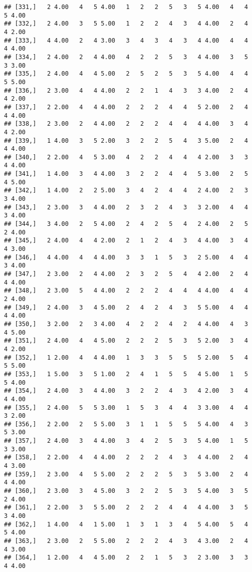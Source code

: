 \documentclass[]{article}
\begin{document}
\begin{verbatim}
## [331,]   2 4.00   4   5 4.00   1   2   2   5   3   5 4.00   4   4   5 4.00
## [332,]   2 4.00   3   5 5.00   1   2   2   4   3   4 4.00   2   4   4 2.00
## [333,]   4 4.00   2   4 3.00   3   4   3   4   3   4 4.00   4   4   4 4.00
## [334,]   2 4.00   2   4 4.00   4   2   2   5   3   4 4.00   3   5   3 3.00
## [335,]   2 4.00   4   4 5.00   2   5   2   5   3   5 4.00   4   4   5 5.00
## [336,]   2 3.00   4   4 4.00   2   2   1   4   3   3 4.00   2   4   4 2.00
## [337,]   2 2.00   4   4 4.00   2   2   2   4   4   5 2.00   2   4   4 4.00
## [338,]   2 3.00   2   4 4.00   2   2   2   4   4   4 4.00   3   4   4 2.00
## [339,]   1 4.00   3   5 2.00   3   2   2   5   4   3 5.00   2   4   4 4.00
## [340,]   2 2.00   4   5 3.00   4   2   2   4   4   4 2.00   3   3   4 4.00
## [341,]   1 4.00   3   4 4.00   3   2   2   4   4   5 3.00   2   5   4 5.00
## [342,]   1 4.00   2   2 5.00   3   4   2   4   4   2 4.00   2   3   3 4.00
## [343,]   2 3.00   3   4 4.00   2   3   2   4   3   3 2.00   4   4   3 4.00
## [344,]   3 4.00   2   5 4.00   2   4   2   5   4   2 4.00   2   5   2 4.00
## [345,]   2 4.00   4   4 2.00   2   1   2   4   3   4 4.00   3   4   4 3.00
## [346,]   4 4.00   4   4 4.00   3   3   1   5   3   2 5.00   4   4   3 4.00
## [347,]   2 3.00   2   4 4.00   2   3   2   5   4   4 2.00   2   4   4 4.00
## [348,]   2 3.00   5   4 4.00   2   2   2   4   4   4 4.00   4   4   2 4.00
## [349,]   2 4.00   3   4 5.00   2   4   2   4   3   5 5.00   4   4   4 4.00
## [350,]   3 2.00   2   3 4.00   4   2   2   4   2   4 4.00   4   3   4 5.00
## [351,]   2 4.00   4   4 5.00   2   2   2   5   3   5 2.00   3   4   4 2.00
## [352,]   1 2.00   4   4 4.00   1   3   3   5   5   5 2.00   5   4   5 5.00
## [353,]   1 5.00   3   5 1.00   2   4   1   5   5   4 5.00   1   5   5 4.00
## [354,]   2 4.00   3   4 4.00   3   2   2   4   3   4 2.00   3   4   4 4.00
## [355,]   2 4.00   5   5 3.00   1   5   3   4   4   3 3.00   4   4   3 2.00
## [356,]   2 2.00   2   5 5.00   3   1   1   5   5   5 4.00   4   3   5 3.00
## [357,]   2 4.00   3   4 4.00   3   4   2   5   3   5 4.00   1   5   3 3.00
## [358,]   2 2.00   4   4 4.00   2   2   2   4   3   4 4.00   2   4   4 3.00
## [359,]   2 3.00   4   5 5.00   2   2   2   5   3   5 3.00   2   4   4 4.00
## [360,]   2 3.00   3   4 5.00   3   2   2   5   3   5 4.00   3   5   2 4.00
## [361,]   2 2.00   3   5 5.00   2   2   2   4   4   4 4.00   3   5   3 4.00
## [362,]   1 4.00   4   1 5.00   1   3   1   3   4   5 4.00   5   4   5 4.00
## [363,]   2 3.00   2   5 5.00   2   2   2   4   3   4 3.00   2   4   4 3.00
## [364,]   1 2.00   4   4 5.00   2   2   1   5   3   2 3.00   3   3   4 4.00

\end{verbatim}
\end{document}
